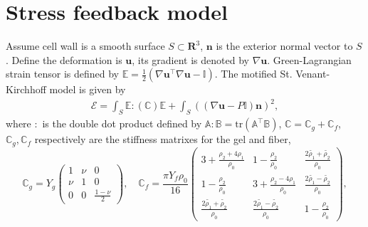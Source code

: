 \documentclass[11pt]{amsart}
\numberwithin{figure}{section}
\theoremstyle{plain}
\theoremstyle{definition}
\numberwithin{equation}{section}
\begin{document}
 
\pagestyle{plain}

\setlength\parskip{1em}

\title{}

\author{}

\date{}


\section{Stress feedback model}
Assume cell wall is a smooth surface $S \subset \mathbf{R}^{3} $, $\bm{n}$ is the exterior normal vector to $S$.
Define the deformation is $\bm{u}$, its gradient is denoted by $\nabla \bm{u}$.
Green-Lagrangian strain tensor is defined by 
$\mathbb{E} = \frac{1}{ 2 } \left(\nabla \bm{u}^{\top} \nabla \bm{u} - \mathbb{I}\right)$.
The motified St. Venant-Kirchhoff model is given by
\begin{align}\label{VK_model}
  \mathcal{E} = \int_S \mathbb{E} : \left(\mathbb{C} \right)\mathbb{E} +  \int_{S} \left( (\nabla \bm{u} - P \mathbb{I})\bm{n}\right)^{2} , 
\end{align}
where $:$ is the double dot product defined by $\mathbb{A}:\mathbb{B} = \text{tr}(\mathbb{A}^{\top} \mathbb{B})$, $\mathbb{C} = \mathbb{C}_{g} + \mathbb{C}_{f} $, 
$\mathbb{C}_{g} , \mathbb{C}_{f} $ respectively are the stiffness matrixes for the gel and fiber,
\[
\mathbb{C}_{g} = Y_{g} \left(
\begin{array}{ccc}
  1 & \nu & 0 \\
  \nu & 1 & 0 \\
  0 & 0 & \frac{ 1-\nu }{ 2 } 
\end{array}
\right), \quad
\mathbb{C}_{f}  = \frac{ \pi Y_{f} \rho_0 }{ 16 } \left(
\begin{array}{ccc}
  3 + \frac{ \rho_2 + 4 \rho_1 }{\rho_0 } & 1- \frac{ \rho_2 }{  \rho_0 } & \frac{ 2\widetilde{\rho_1} + \widetilde{\rho_2}}{\rho_0  }  \\
  1- \frac{ \rho_2 }{  \rho_0 } &  3 + \frac{ \rho_2 - 4 \rho_1 }{\rho_0 } & \frac{ 2\widetilde{\rho_1} - \widetilde{\rho_2}}{\rho_0  }  \\
  \frac{ 2\widetilde{\rho_1} + \widetilde{\rho_2}}{\rho_0  }  & \frac{ 2\widetilde{\rho_1} - \widetilde{\rho_2}}{\rho_0  } &   1- \frac{ \rho_2 }{  \rho_0 } 
\end{array}
\right),
\] 
\end{document}

